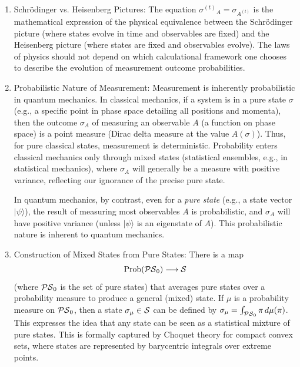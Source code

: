 \begin{remark} \label{rem:1.9}
\mbox{} %
\begin{enumerate}
\item Schrödinger vs. Heisenberg Pictures: The equation ${\sigma^{(t)}}_{A}=\sigma_{A^{(t)}}$ is the mathematical expression of the physical equivalence between the Schrödinger picture (where states evolve in time and observables are fixed) and the Heisenberg picture (where states are fixed and observables evolve). The laws of physics should not depend on which calculational framework one chooses to describe the evolution of measurement outcome probabilities.

\item Probabilistic Nature of Measurement: Measurement is inherently probabilistic in quantum mechanics. In classical mechanics, if a system is in a pure state $\sigma$ (e.g., a specific point in phase space detailing all positions and momenta), then the outcome $\sigma_A$ of measuring an observable $A$ (a function on phase space) is a point measure (Dirac delta measure at the value $A(\sigma)$). Thus, for pure classical states, measurement is deterministic. Probability enters classical mechanics only through mixed states (statistical ensembles, e.g., in statistical mechanics), where $\sigma_A$ will generally be a measure with positive variance, reflecting our ignorance of the precise pure state.

In quantum mechanics, by contrast, even for a \emph{pure state} (e.g., a state vector $|\psi\rangle$), the result of measuring most observables $A$ is probabilistic, and $\sigma_A$ will have positive variance (unless $|\psi\rangle$ is an eigenstate of $A$). This probabilistic nature is inherent to quantum mechanics.

\item Construction of Mixed States from Pure States: There is a map
\[ \text{Prob}(\mathcal{PS}_0)\longrightarrow \mathcal{S}  \]
(where $\mathcal{PS}_0$ is the set of pure states) that averages pure states over a probability measure to produce a general (mixed) state. If $\mu$ is a probability measure on $\mathcal{PS}_0$, then a state $\sigma_\mu \in \mathcal{S}$ can be defined by $\sigma_\mu = \int_{\mathcal{PS}_0} \pi \, d\mu(\pi)$. This expresses the idea that any state can be seen as a statistical mixture of pure states. This is formally captured by Choquet theory for compact convex sets, where states are represented by barycentric integrals over extreme points.


\end{enumerate}
\end{remark}
